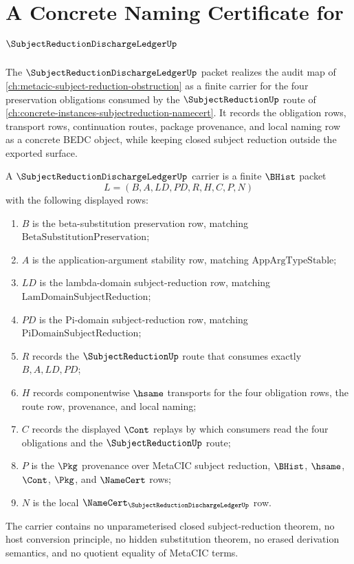 \chapter{A Concrete Naming Certificate for $\SubjectReductionDischargeLedgerUp$}
\label{ch:concrete-instances-subjectreductiondischargeledger-namecert}

The $\SubjectReductionDischargeLedgerUp$ packet realizes the audit map of \autoref{ch:metacic-subject-reduction-obstruction} as a finite carrier for the four preservation obligations consumed by the $\SubjectReductionUp$ route of \autoref{ch:concrete-instances-subjectreduction-namecert}. It records the obligation rows, transport rows, continuation routes, package provenance, and local naming row as a concrete BEDC object, while keeping closed subject reduction outside the exported surface.

\begin{definition}
\label{def:subject-reduction-discharge-ledger-carrier}
A $\SubjectReductionDischargeLedgerUp$ carrier is a finite $\BHist$ packet
$$
L=(B,A,LD,PD,R,H,C,P,N)
$$
with the following displayed rows:
\begin{enumerate}
\item $B$ is the beta-substitution preservation row, matching $\mathrm{BetaSubstitutionPreservation}$;
\item $A$ is the application-argument stability row, matching $\mathrm{AppArgTypeStable}$;
\item $LD$ is the lambda-domain subject-reduction row, matching $\mathrm{LamDomainSubjectReduction}$;
\item $PD$ is the Pi-domain subject-reduction row, matching $\mathrm{PiDomainSubjectReduction}$;
\item $R$ records the $\SubjectReductionUp$ route that consumes exactly $B,A,LD,PD$;
\item $H$ records componentwise $\hsame$ transports for the four obligation rows, the route row, provenance, and local naming;
\item $C$ records the displayed $\Cont$ replays by which consumers read the four obligations and the $\SubjectReductionUp$ route;
\item $P$ is the $\Pkg$ provenance over MetaCIC subject reduction, $\BHist$, $\hsame$, $\Cont$, $\Pkg$, and $\NameCert$ rows;
\item $N$ is the local $\NameCert_{\SubjectReductionDischargeLedgerUp}$ row.
\end{enumerate}
The carrier contains no unparameterised closed subject-reduction theorem, no host conversion principle, no hidden substitution theorem, no erased derivation semantics, and no quotient equality of MetaCIC terms.
\end{definition}

